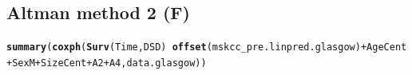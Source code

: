 \documentclass{article}\usepackage[]{graphicx}\usepackage[]{color}
\makeatletter
\newcommand{\hlopt}[1]{\textcolor[rgb]{0,0,0}{#1}}%
\newcommand{\hlstd}[1]{\textcolor[rgb]{0.345,0.345,0.345}{#1}}%
\newcommand{\hlkwd}[1]{\textcolor[rgb]{0.737,0.353,0.396}{\textbf{#1}}}%
\newenvironment{kframe}{%
 \def\at@end@of@kframe{}%
 \ifinner\ifhmode%
  \def\at@end@of@kframe{\end{minipage}}%
  \begin{minipage}{\columnwidth}%
 \fi\fi%
 \def\FrameCommand##1{\hskip\@totalleftmargin \hskip-\fboxsep
 \colorbox{shadecolor}{##1}\hskip-\fboxsep
     \hskip-\linewidth \hskip-\@totalleftmargin \hskip\columnwidth}%
 \MakeFramed {\advance\hsize-\width
   \@totalleftmargin\z@ \linewidth\hsize
   \@setminipage}}%
 {\par\unskip\endMakeFramed%
 \at@end@of@kframe}
\newenvironment{knitrout}{}{} %
\makeatother
\begin{document}
\subsection{Altman method 2 (F)}
\begin{knitrout}
\color{fgcolor}\begin{kframe}
\begin{alltt}
\hlkwd{summary}\hlstd{(}\hlkwd{coxph}\hlstd{(}\hlkwd{Surv}\hlstd{(Time, DSD)} \hlopt{~} \hlkwd{offset}\hlstd{(mskcc_pre.linpred.glasgow)} \hlopt{+} \hlstd{AgeCent} \hlopt{+} \hlstd{SexM} \hlopt{+} \hlstd{SizeCent} \hlopt{+} \hlstd{A2} \hlopt{+} \hlstd{A4, data.glasgow))}
\end{alltt}


{\ttfamily\noindent\color{warningcolor}{\#\# Warning in fitter(X, Y, strats, offset, init, control, weights = weights, : Ran out of iterations and did not converge}}


\end{kframe}
\end{knitrout}
\end{document}
